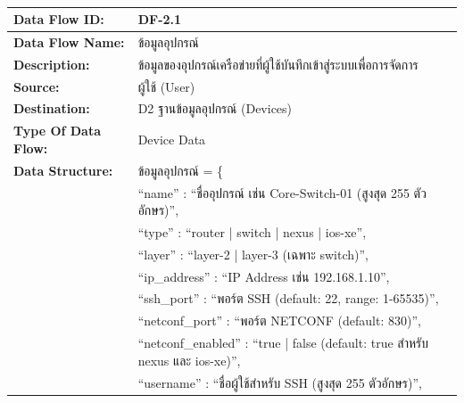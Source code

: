 
\begin{table}[H]
    \caption{}
    \label{tab:df-2-1}
    \fontSixTeen 
    \begin{tabularx}{\textwidth}{|l|L|} 
        \hline
        \textbf{Data Flow ID:} & DF-2.1 \\
        \hline
        \textbf{Data Flow Name:} & ข้อมูลอุปกรณ์ \\
        \hline
        \textbf{Description:} & ข้อมูลของอุปกรณ์เครือข่ายที่ผู้ใช้บันทึกเข้าสู่ระบบเพื่อการจัดการ \\
        \hline
        \textbf{Source:} & ผู้ใช้ (User) \\
        \hline
        \textbf{Destination:} & D2 ฐานข้อมูลอุปกรณ์ (Devices) \\
        \hline
        \textbf{Type Of Data Flow:} & Device Data \\
        \hline
        \textbf{Data Structure:} & ข้อมูลอุปกรณ์ = \{ \nonumber \\
                        & \hspace{1em} ``name'' : ``ชื่ออุปกรณ์ เช่น Core-Switch-01 (สูงสุด 255 ตัวอักษร)'', \nonumber \\
                        & \hspace{1em} ``type'' : ``router | switch | nexus | ios-xe'', \nonumber \\
                        & \hspace{1em} ``layer'' : ``layer-2 | layer-3 (เฉพาะ switch)'', \nonumber \\
                        & \hspace{1em} ``ip\_address'' : ``IP Address เช่น 192.168.1.10'', \nonumber \\
                        & \hspace{1em} ``ssh\_port'' : ``พอร์ต SSH (default: 22, range: 1-65535)'', \nonumber \\
                        & \hspace{1em} ``netconf\_port'' : ``พอร์ต NETCONF (default: 830)'', \nonumber \\
                        & \hspace{1em} ``netconf\_enabled'' : ``true | false (default: true สำหรับ nexus และ ios-xe)'', \nonumber \\
                        & \hspace{1em} ``username'' : ``ชื่อผู้ใช้สำหรับ SSH (สูงสุด 255 ตัวอักษร)'', \nonumber \\

\end{tabularx}
\end{table}
